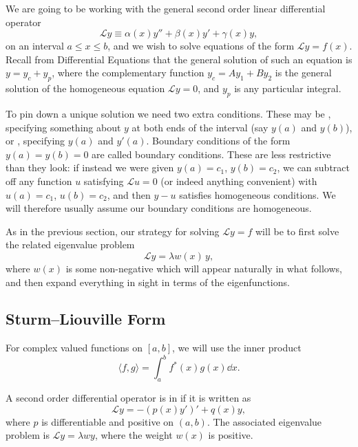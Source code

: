 \documentclass[a4paper]{scrartcl}
\begin{document}
We are going to be working with the general second order linear differential operator
$$
\mathcal{L} y \equiv \alpha(x) y'' + \beta(x) y' + \gamma(x) y,
$$
on an interval $a \leq x \leq b$, and we wish to solve equations of the form $\mathcal{L}y = f(x)$.
Recall from Differential Equations that the general solution of such an equation is $y = y_c + y_p$, where the complementary function $y_c = A y_1 + B y_2$ is the general solution of the homogeneous equation $\mathcal{L} y = 0$, and $y_p$ is any particular integral.

To pin down a unique solution we need two extra conditions. These may be , specifying something about $y$ at both ends of the interval (say $y(a)$ and $y(b)$), or , specifying $y(a)$ and $y'(a)$.
Boundary conditions of the form $y(a) = y(b) = 0$ are called  boundary conditions. These are less restrictive than they look: if instead we were given $y(a) = c_1$, $y(b) = c_2$, we can subtract off any function $u$ satisfying $\mathcal{L}u = 0$ (or indeed anything convenient) with $u(a) = c_1$, $u(b) = c_2$, and then $y - u$ satisfies homogeneous conditions. We will therefore usually assume our boundary conditions are homogeneous.

As in the previous section, our strategy for solving $\mathcal{L} y = f$ will be to first solve the related eigenvalue problem
$$
\mathcal{L} y = \lambda w(x)\, y,
$$
where $w(x)$ is some non-negative  which will appear naturally in what follows, and then expand everything in sight in terms of the eigenfunctions.

\subsection{Sturm--Liouville Form}

For complex valued functions on $[a, b]$, we will use the inner product
$$
\langle f, g \rangle = \int_a^b f^*(x) g(x) \dd x.
$$

\begin{definition}
    A second order differential operator is in  if it is written as
    $$
    \mathcal{L} y = -\left(p(x) y'\right)' + q(x) y,
    $$
    where $p$ is differentiable and positive on $(a, b)$.
    The associated eigenvalue problem is $\mathcal{L}y = \lambda w y$, where the weight $w(x)$ is positive.
\end{definition}
\end{document}
